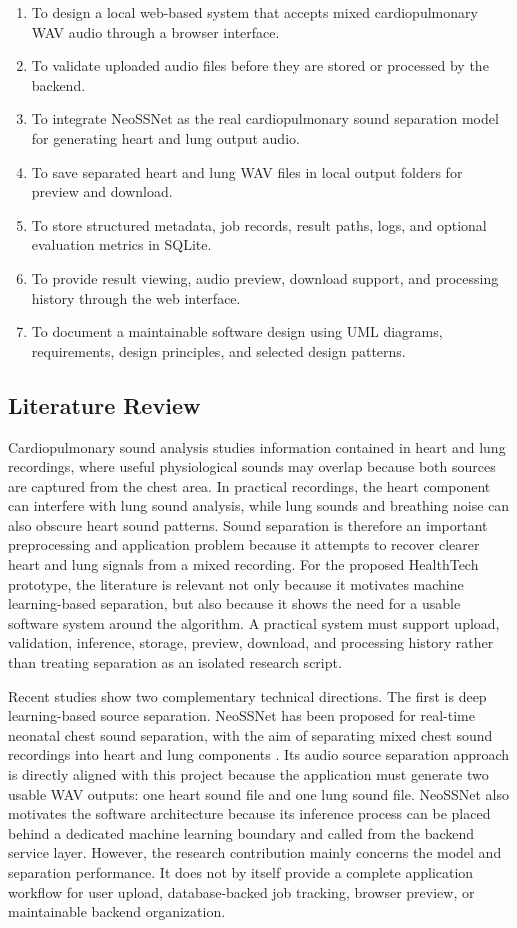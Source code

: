 \begin{enumerate}
  \item To design a local web-based system that accepts mixed cardiopulmonary WAV audio through a browser interface.
  \item To validate uploaded audio files before they are stored or processed by the backend.
  \item To integrate NeoSSNet as the real cardiopulmonary sound separation model for generating heart and lung output audio.
  \item To save separated heart and lung WAV files in local output folders for preview and download.
  \item To store structured metadata, job records, result paths, logs, and optional evaluation metrics in SQLite.
  \item To provide result viewing, audio preview, download support, and processing history through the web interface.
  \item To document a maintainable software design using UML diagrams, requirements, design principles, and selected design patterns.
\end{enumerate}

\subsection{Literature Review}

Cardiopulmonary sound analysis studies information contained in heart and lung recordings, where useful physiological sounds may overlap because both sources are captured from the chest area. In practical recordings, the heart component can interfere with lung sound analysis, while lung sounds and breathing noise can also obscure heart sound patterns. Sound separation is therefore an important preprocessing and application problem because it attempts to recover clearer heart and lung signals from a mixed recording. For the proposed HealthTech prototype, the literature is relevant not only because it motivates machine learning-based separation, but also because it shows the need for a usable software system around the algorithm. A practical system must support upload, validation, inference, storage, preview, download, and processing history rather than treating separation as an isolated research script.

Recent studies show two complementary technical directions. The first is deep learning-based source separation. NeoSSNet has been proposed for real-time neonatal chest sound separation, with the aim of separating mixed chest sound recordings into heart and lung components \parencite{poh2024neossnet}. Its audio source separation approach is directly aligned with this project because the application must generate two usable WAV outputs: one heart sound file and one lung sound file. NeoSSNet also motivates the software architecture because its inference process can be placed behind a dedicated machine learning boundary and called from the backend service layer. However, the research contribution mainly concerns the model and separation performance. It does not by itself provide a complete application workflow for user upload, database-backed job tracking, browser preview, or maintainable backend organization.

